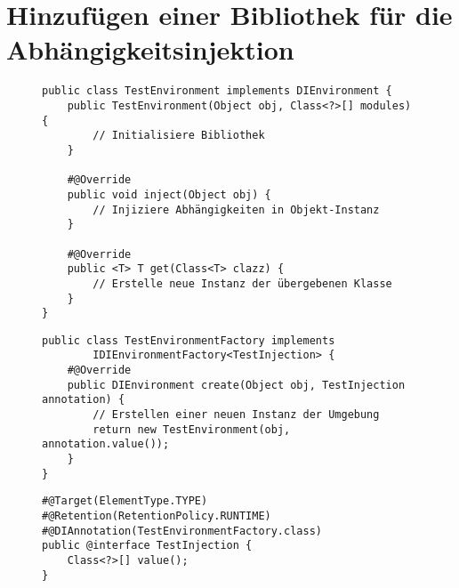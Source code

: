 \chapter{Hinzufügen einer Bibliothek für die Abhängigkeitsinjektion}
\label{appendix:add_new_di_library}
\begin{figure}[H]
	\begin{lstlisting}[caption=Beispiel -- Erstellen einer neuen Umgebung, captionpos=b, nolol]
public class TestEnvironment implements DIEnvironment {
	public TestEnvironment(Object obj, Class<?>[] modules) {
		// Initialisiere Bibliothek
	}

	#@Override
	public void inject(Object obj) {
		// Injiziere Abhängigkeiten in Objekt-Instanz
	}

	#@Override
	public <T> T get(Class<T> clazz) {
		// Erstelle neue Instanz der übergebenen Klasse
	}
}
	\end{lstlisting}
\end{figure}
\begin{figure}[H]
	\begin{lstlisting}[caption=Beispiel -- Erstellen einer neuen Factory, captionpos=b, nolol]
public class TestEnvironmentFactory implements 
		IDIEnvironmentFactory<TestInjection> {
	#@Override
	public DIEnvironment create(Object obj, TestInjection annotation) {
		// Erstellen einer neuen Instanz der Umgebung
		return new TestEnvironment(obj, annotation.value());
	}
}
	\end{lstlisting}
\end{figure}
\begin{figure}[H]
	\begin{lstlisting}[caption=Beispiel -- Erstellen einer neuen Annotation, captionpos=b, nolol]
#@Target(ElementType.TYPE)
#@Retention(RetentionPolicy.RUNTIME)
#@DIAnnotation(TestEnvironmentFactory.class)
public @interface TestInjection {
	Class<?>[] value();
}
	\end{lstlisting}
\end{figure}